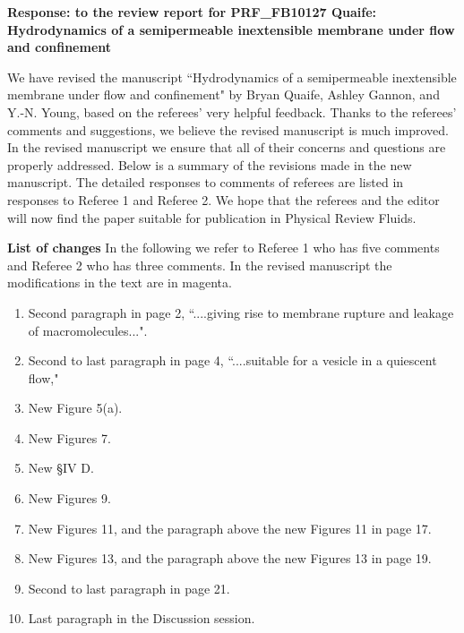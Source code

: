 \documentclass[12pt]{article}
\begin{document}
{\large \bf {\bf Response:} to the review report for PRF\_FB10127 Quaife: Hydrodynamics of a semipermeable inextensible membrane under flow and confinement}
\vspace{0.5cm}

We have revised the manuscript ``Hydrodynamics of a semipermeable inextensible membrane under flow and confinement"  
by Bryan Quaife, Ashley Gannon, and Y.-N. Young, 
based on 
the referees' very helpful feedback.  
Thanks to the referees' comments
and suggestions, we believe the revised manuscript is much
improved. 
In the revised manuscript we ensure that
all of their concerns and questions are properly addressed.
Below is a summary of the revisions made in the new manuscript.
The detailed responses to comments of referees are listed in 
responses to Referee 1 and Referee 2.
We hope that the referees and the
editor will now find the paper suitable for publication in 
Physical Review Fluids.

\vspace{0.5cm}
{\large \bf List of changes}
In the following we refer to Referee 1 who has five comments and Referee
2 who has three comments. In the revised manuscript the modifications in
the text are in magenta.

\begin{enumerate}
\item{Second paragraph in page 2, ``....giving rise to membrane rupture and leakage of macromolecules...".}
 
\item{Second to last paragraph in page 4, ``....suitable for a vesicle in a quiescent flow,"}

\item{New Figure 5(a).}

\item{New Figures 7.}

\item{New \S IV D.}

\item{New Figures 9.}

\item{New Figures 11, and the paragraph above the new Figures 11 in page 17.}

\item{New Figures 13, and the paragraph above the new Figures 13 in page 19.}

\item{Second to last paragraph in page 21.}

\item{Last paragraph in the Discussion session.}

\end{enumerate}
\end{document}
